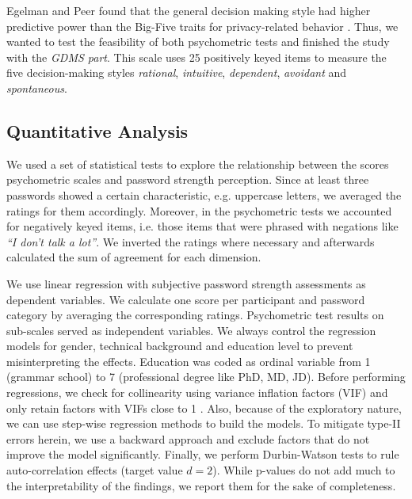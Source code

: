 Egelman and Peer found that the general decision making style had higher predictive power than the Big-Five traits for privacy-related behavior \cite{Egelman2015AverageUser}. Thus, we wanted to test the feasibility of both psychometric tests and finished the study with the \textit{GDMS part}. This scale uses 25 positively keyed items to measure the five decision-making styles \textit{rational}, \textit{intuitive}, \textit{dependent}, \textit{avoidant} and \textit{spontaneous}. 

\subsection{Quantitative Analysis}
We used a set of statistical tests to explore the relationship between the scores psychometric scales and password strength perception. Since at least three passwords showed a certain characteristic, e.g. uppercase letters, we averaged the ratings for them accordingly. Moreover, in the psychometric tests we accounted for negatively keyed items, i.e. those items that were phrased with negations like \textit{``I don't talk a lot''}. We inverted the ratings where necessary and afterwards calculated the sum of agreement for each dimension. 

We use linear regression with subjective password strength assessments as dependent variables. We calculate one score per participant and password category by averaging the corresponding ratings. Psychometric test results on sub-scales served as independent variables. We always control the regression models for gender, technical background and education level to prevent misinterpreting the effects. Education was coded as ordinal variable from 1 (grammar school) to 7 (professional degree like PhD, MD, JD). Before performing regressions, we check for collinearity using variance inflation factors (VIF) and only retain factors with VIFs close to 1 \cite[p. 217]{Weisberg2005applied}. Also, because of the exploratory nature, we can use step-wise regression methods to build the models. To mitigate type-II errors herein, we use a backward approach \cite[p. 161]{Field2005DiscoveringStatistics} and exclude factors that do not improve the model significantly. Finally, we perform Durbin-Watson tests to rule auto-correlation effects (target value $d=2$). While p-values do not add much to the interpretability of the findings, we report them for the sake of completeness.  

